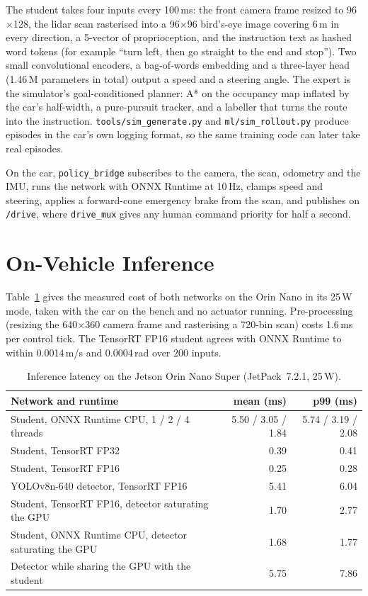\documentclass[12pt]{article}
\begin{document}
The student takes four inputs every 100\,ms: the front camera frame resized to
96$\times$128, the lidar scan rasterised into a 96$\times$96 bird's-eye image covering 6\,m in
every direction, a 5-vector of proprioception, and the instruction text as hashed word tokens
(for example ``turn left, then go straight to the end and stop''). Two small convolutional
encoders, a bag-of-words embedding and a three-layer head (1.46\,M parameters in total) output
a speed and a steering angle. The expert is the simulator's goal-conditioned planner: A* on the
occupancy map inflated by the car's half-width, a pure-pursuit tracker, and a labeller that
turns the route into the instruction. \texttt{tools/sim\_generate.py} and
\texttt{ml/sim\_rollout.py} produce episodes in the car's own logging format, so the same
training code can later take real episodes.

On the car, \texttt{policy\_bridge} subscribes to the camera, the scan, odometry and the IMU,
runs the network with ONNX Runtime at 10\,Hz, clamps speed and steering, applies a forward-cone
emergency brake from the scan, and publishes on \texttt{/drive}, where \texttt{drive\_mux}
gives any human command priority for half a second.

\section*{On-Vehicle Inference}
\label{sec:inference}

Table~\ref{tab:latency} gives the measured cost of both networks on the Orin Nano in its 25\,W
mode, taken with the car on the bench and no actuator running. Pre-processing (resizing the
640$\times$360 camera frame and rasterising a 720-bin scan) costs 1.6\,ms per control tick.
The TensorRT FP16 student agrees with ONNX Runtime to within 0.0014\,m/s and 0.0004\,rad over
200 inputs.

\begin{table}[H]
  \centering
  \small
  \begin{tabular}{p{7.6cm} r r}
    \toprule
    Network and runtime & mean (ms) & p99 (ms) \\
    \midrule
    Student, ONNX Runtime CPU, 1 / 2 / 4 threads & 5.50 / 3.05 / 1.84 & 5.74 / 3.19 / 2.08 \\
    Student, TensorRT FP32 & 0.39 & 0.41 \\
    Student, TensorRT FP16 & 0.25 & 0.28 \\
    YOLOv8n-640 detector, TensorRT FP16 & 5.41 & 6.04 \\
    \midrule
    Student, TensorRT FP16, detector saturating the GPU & 1.70 & 2.77 \\
    Student, ONNX Runtime CPU, detector saturating the GPU & 1.68 & 1.77 \\
    Detector while sharing the GPU with the student & 5.75 & 7.86 \\
    \bottomrule
  \end{tabular}
  \caption{Inference latency on the Jetson Orin Nano Super (JetPack~7.2.1, 25\,W).}
  \label{tab:latency}
\end{table}
\end{document}
